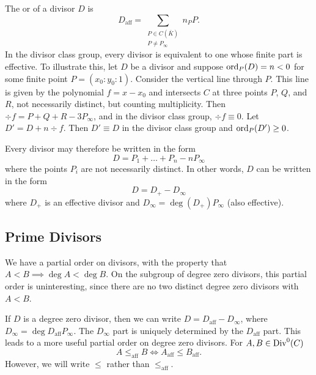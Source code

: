 The  or  of a divisor $D$ is
\[ D_{\text{aff}} = \sum_{\substack{P \in C(\bar K) \\ P \neq P_\infty}} n_P P. \]
In the divisor class group, every divisor is equivalent to one whose finite part is effective.
To illustrate this, let $D$ be a divisor and suppose $\operatorname{ord}_P(D) = n < 0$ for some finite point $P = (x_0 : y_0 : 1)$.
Consider the vertical line through $P$.
This line is given by the polynomial $f = x - x_0$ and intersects $C$ at three points $P$, $Q$, and $R$,
not necessarily distinct, but counting multiplicity.
Then $\div f = P + Q + R - 3P_\infty$, and in the divisor class group, $\div f \equiv 0$.
Let $D' = D + n \div f$.
Then $D' \equiv D$ in the divisor class group and $\operatorname{ord}_P(D') \geq 0$.

Every divisor may therefore be written in the form
  \[ D = P_1 + \ldots + P_n - nP_\infty \]
where the points $P_i$ are not necessarily distinct.
In other words, $D$ can be written in the form
  \[ D = D_+ - D_\infty \]
where $D_+$ is an effective divisor and $D_\infty = \deg(D_+)P_\infty$ (also effective).
\begin{comment}
Unless otherwise specified, we will assume that a divisor $D$ is of this form.
Since $D_\infty$ is determined uniquely by $D^+$,
we will furthermore drop the $D_\infty$ part and denote $D$ by its positive part only.
That is, if $D = P + Q + R - 3P_\infty$, we will instead write simply $D = P + Q + R$ and call $D$ a degree 3 divisor.
\end{comment}



\subsection{Prime Divisors}

We have a partial order on divisors, with the property that $A < B \implies \deg A < \deg B$.
On the subgroup of degree zero divisors, this partial order is uninteresting, since there are no two distinct degree zero divisors with $A < B$.

If $D$ is a degree zero divisor, then we can write $D = D_{\text{aff}} - D_\infty$, where $D_\infty = \deg D_{\text{aff}}P_\infty$.
The $D_\infty$ part is uniquely determined by the $D_{\text{aff}}$ part.
This leads to a more useful partial order on degree zero divisors.
For $A, B \in \operatorname{Div}^0(C)$
  \[ A \leq_{\text{aff}} B \iff A_{\text{aff}} \leq B_{\text{aff}}. \]
However, we will write $\leq$ rather than $\leq_{\text{aff}}$.

